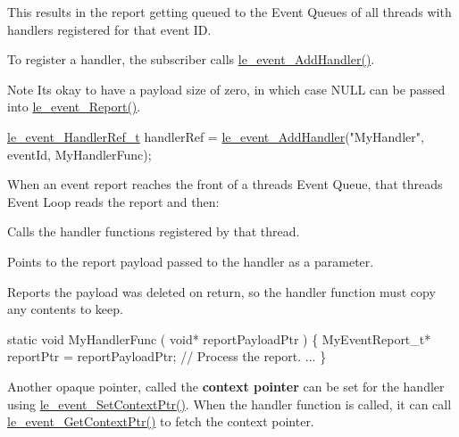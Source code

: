 This results in the report getting queued to the Event Queues of all threads with handlers registered for that event I\+D.

To register a handler, the subscriber calls {\ttfamily \hyperlink{le__event_loop_8h_ae65a65b4111618f47d7e6d57a48289e5}{le\+\_\+event\+\_\+\+Add\+Handler()}}.

\begin{DoxyNote}{Note}
It\textquotesingle{}s okay to have a payload size of zero, in which case N\+U\+L\+L can be passed into \hyperlink{le__event_loop_8h_ae3ffe6990b70fb572b4eef06739b4f54}{le\+\_\+event\+\_\+\+Report()}.
\end{DoxyNote}

\begin{DoxyCode}
\hyperlink{le__event_loop_8h_ae7ab96b8e3441b3d484fcf52aa7a9dad}{le\_event\_HandlerRef\_t} handlerRef = \hyperlink{le__event_loop_8h_ae65a65b4111618f47d7e6d57a48289e5}{le\_event\_AddHandler}(\textcolor{stringliteral}{"MyHandler"},
       eventId, MyHandlerFunc);
\end{DoxyCode}


When an event report reaches the front of a thread\textquotesingle{}s Event Queue, that thread\textquotesingle{}s Event Loop reads the report and then\+:
\begin{DoxyItemize}
\item Calls the handler functions registered by that thread.
\item Points to the report payload passed to the handler as a parameter.
\item Reports the payload was deleted on return, so the handler function must copy any contents to keep.
\end{DoxyItemize}


\begin{DoxyCode}
\textcolor{keyword}{static} \textcolor{keywordtype}{void} MyHandlerFunc
(
    \textcolor{keywordtype}{void}* reportPayloadPtr
)
\{
    MyEventReport\_t* reportPtr = reportPayloadPtr;
    \textcolor{comment}{// Process the report.}
    ...
\}
\end{DoxyCode}


Another opaque pointer, called the {\bfseries  context pointer } can be set for the handler using {\ttfamily \hyperlink{le__event_loop_8h_ae0c4307a9715794c720e525032aa0bfd}{le\+\_\+event\+\_\+\+Set\+Context\+Ptr()}}. When the handler function is called, it can call \hyperlink{le__event_loop_8h_a1c73916295cc9e17af07e02756aa86c9}{le\+\_\+event\+\_\+\+Get\+Context\+Ptr()} to fetch the context pointer.


